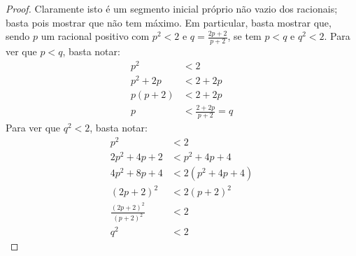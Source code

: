 \documentclass[../../../include/open-logic-section]{subfiles}
\begin{document}
\begin{proof}
Claramente isto é um segmento inicial próprio não vazio dos racionais; basta pois
mostrar que não tem máximo. Em particular, basta mostrar que, sendo $p$ um
racional positivo com $p^2 < 2$ e $q =
\frac{2p+2}{p+2}$, se tem $p < q$ e $q^2 < 2$. Para ver que $p < q$,
basta notar:
\begin{align*}
	p^2 &< 2\\
	p^2 + 2p &< 2 + 2p\\
	p(p + 2) &< 2 + 2p\\
	p &< \tfrac{2+2p}{p+2} = q
\end{align*}
Para ver que $q^2 < 2$, basta notar:
\begin{align*}
	p^2 &< 2\\
	2p^2 + 4p + 2 &< p^2 + 4p+ 4\\
	4p^2 + 8p + 4 &< 2(p^2 + 4p + 4)\\
	(2p+2)^2 & <2(p+2)^2\\
	\tfrac{(2p+2)^2}{(p+2)^2} &< 2\\
	q^2 &< 2
\end{align*}
\end{proof}
\end{document}
